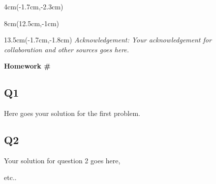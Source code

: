 \documentclass[12pt, oneside]{article}
\begin{document}


\begin{textblock*}{4cm}(-1.7cm,-2.3cm)
\end{textblock*}

\begin{textblock*}{8cm}(12.5cm,-1cm)
\end{textblock*}
\begin{textblock*}{13.5cm}(-1.7cm,-1.8cm)
\noindent \textit{\footnotesize Acknowledgement: Your acknowledgement for collaboration and other sources goes here. } 
\end{textblock*}

\vspace{1cm}

\begin{center}
\textbf{\Large Homework \#}
\end{center}


\subsection*{Q1} Here goes your solution for the first problem.



\subsection*{Q2}
Your solution for question 2 goes here, 


etc.. 
\end{document}
